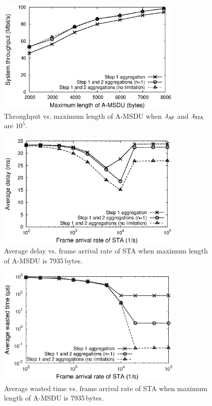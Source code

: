\documentclass[master]{kuisthesis}		%
\begin{document}
			\begin{figure}[t]
				\begin{center}
					\includegraphics[width=0.8\textwidth]{graph/thr_max.eps}
					\caption{Throughput vs. maximum length of A-MSDU when $\lambda_{\rm AP}$ and $\lambda_{\rm STA}$ are $10^{5}$.}
					\label{fig:thr_max}
				\end{center}
			\end{figure}
			\begin{figure}[t]
				\begin{center}
					\includegraphics[width=0.8\textwidth]{graph/dly_lmd.eps}
					\caption{Average delay vs. frame arrival rate of STA when maximum length of A-MSDU is 7935\,bytes.}
					\label{fig:dly_lmd}
				\end{center}
			\end{figure}
			\begin{figure}[t]
				\begin{center}
					\includegraphics[width=0.8\textwidth]{graph/wst_lmd.eps}
					\caption{Average wasted time vs. frame arrival rate of STA when maximum length of A-MSDU is 7935\,bytes.}
					\label{fig:wst_lmd}
				\end{center}
			\end{figure}
\end{document}
